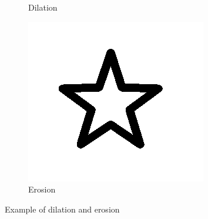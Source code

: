 \begin{figure}[h]
\begin{subfigure}{.33\textwidth}
        \caption{Dilation}
    \end{subfigure}%
    \begin{subfigure}{.33\textwidth}
        \centering
        \includegraphics[width=.99\linewidth]{images/literature/morphological/erosion}
        \caption{Erosion}
    \end{subfigure}
    \caption{Example of dilation and erosion}
    \label{fig:star_dilate_erode}
\end{figure}



